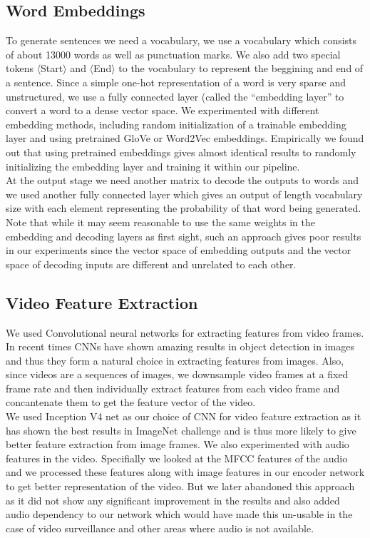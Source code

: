 \documentclass[12pt]{article}
\begin{document}
\subsection{Word Embeddings}
To generate sentences we need a vocabulary, we use a vocabulary which consists of about 13000 words as well as punctuation marks. We also add two special tokens $\langle$Start$\rangle$ and $\langle$End$\rangle$ to the vocabulary to represent the beggining and end of a sentence. Since a simple one-hot representation of a word is very sparse and unstructured, we use a fully connected layer (called the ``embedding layer'' to convert a word to a dense vector space. We experimented with different embedding methods, including random initialization of a trainable embedding layer and using pretrained GloVe or Word2Vec embeddings. Empirically we found out that using pretrained embeddings gives almost identical results to randomly initializing the embedding layer and training it within our pipeline.\\
At the output stage we need another matrix to decode the outputs to words and we used another fully connected layer which gives an output of length vocabulary size with each element representing the probability of that word being generated. Note that while it may seem reasonable to use the same weights in the embedding and decoding layers as first sight, such an approach gives poor results in our experiments since the vector space of embedding outputs and the vector space of decoding inputs are different and unrelated to each other.

\subsection{Video Feature Extraction}

	We used Convolutional neural networks for extracting features from video frames. In recent times CNNs have shown amazing results in object
	detection in images and thus they form a natural choice in extracting features from images. Also, since videos are a sequences of images, we
	downsample video frames at a fixed frame rate and then individually extract features from each video frame and concantenate them to get 
	the feature vector of the video.\\
	We used Inception V4 net as our choice of CNN for video feature extraction as it has shown the best results in ImageNet challenge and is thus
	more likely to give better feature extraction from image frames. We also experimented with audio features in the video. Specifially we looked
	at the MFCC features of the audio and we processed these features along with image features in our encoder network to get better representation
	of the video. But we later abandoned this approach as it did not show any significant improvement in the results and also added audio dependency
	to our network which would have made this un-usable in the case of video surveillance and other areas where audio is not available.
	
\end{document}
